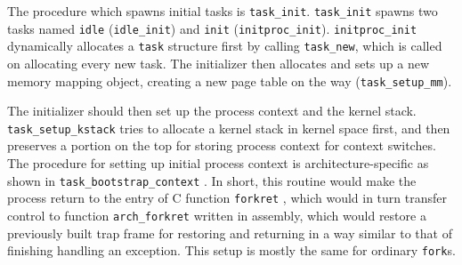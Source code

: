 \documentclass{report}
\newenvironment{hilight}{\color{red}}{\color{black}}
\begin{document}
	\begin{hilight}
		The procedure which spawns initial tasks is \texttt{task\_init}.
		  \texttt{task\_init} spawns two tasks named \texttt{idle} (\texttt{idle\_init})
		and
		\texttt{init} (\texttt{initproc\_init}).
		\texttt{initproc\_init} dynamically allocates a \texttt{task} structure first by
		calling \texttt{task\_new},
		which is called on allocating every new task.  The initializer then allocates and 
		sets up a new memory mapping object, creating a new page table on the way
		\marginpar{
			\footnotesize\ttfamily
			\textcolor{red}{kern/sched/task.c:48}
		}
		(\texttt{task\_setup\_mm}).

		The initializer should then set up the process context and the kernel stack.
		\texttt{task\_setup\_kstack}
		 tries to allocate a kernel stack in kernel space first, and then preserves
		a portion on the top for storing process context for context switches.
		The procedure for setting up initial process context is architecture-specific as
		shown in \texttt{task\_bootstrap\_context}
		.  In short, this routine would make the process return to the entry of C
		function \texttt{forkret}
		, which would in turn transfer control to function \texttt{arch\_forkret}
		 written in assembly, which would restore a previously built trap frame
		for restoring and returning in a way similar to that of finishing handling
		an exception.  This setup is mostly the same for ordinary \texttt{fork}s.


\end{hilight}
\end{document}
